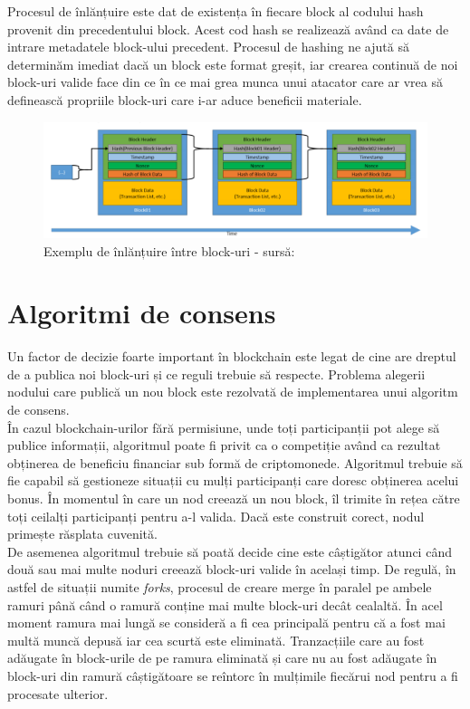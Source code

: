 Procesul de înlănțuire este dat de existența în fiecare block al codului hash provenit din precedentului block. Acest cod hash se realizează având ca date de intrare metadatele block-ului precedent. Procesul de hashing ne ajută să determinăm imediat dacă un block este format greșit, iar crearea continuă de noi block-uri valide face din ce în ce mai grea munca unui atacator care ar vrea să definească propriile block-uri care i-ar aduce beneficii materiale.\\

\begin{figure}[H] 
\centering
\includegraphics[scale=0.55]{Images/BC_Chaining.png}
\caption{Exemplu de înlănțuire între block-uri - sursă: \cite{Blockchain_Overview_NIST}}
\end{figure}

\section{Algoritmi de consens}

Un factor de decizie foarte important în blockchain este legat de cine are dreptul de a publica noi block-uri și ce reguli trebuie să respecte. Problema alegerii nodului care publică un nou block este rezolvată de implementarea unui algoritm de consens.\\

În cazul blockchain-urilor fără permisiune, unde toți participanții pot alege să publice informații, algoritmul poate fi privit ca o competiție având ca rezultat obținerea de beneficiu financiar sub formă de criptomonede. Algoritmul trebuie să fie capabil să gestioneze situații cu mulți participanți care doresc obținerea acelui bonus. În momentul în care un nod creează un nou block, îl trimite în rețea către toți ceilalți participanți pentru a-l valida. Dacă este construit corect, nodul primește răsplata cuvenită.\\

De asemenea algoritmul trebuie să poată decide cine este câștigător atunci când două sau mai multe noduri creează block-uri valide în același timp. De regulă, în astfel de situații numite \textit{forks}, procesul de creare merge în paralel pe ambele ramuri până când o ramură conține mai multe block-uri decât cealaltă. În acel moment ramura mai lungă se consideră a fi cea principală pentru că a fost mai multă muncă depusă iar cea scurtă este eliminată. Tranzacțiile care au fost adăugate în block-urile de pe ramura eliminată și care nu au fost adăugate în block-uri din ramură câștigătoare se reîntorc în mulțimile fiecărui nod pentru a fi procesate ulterior.\\


